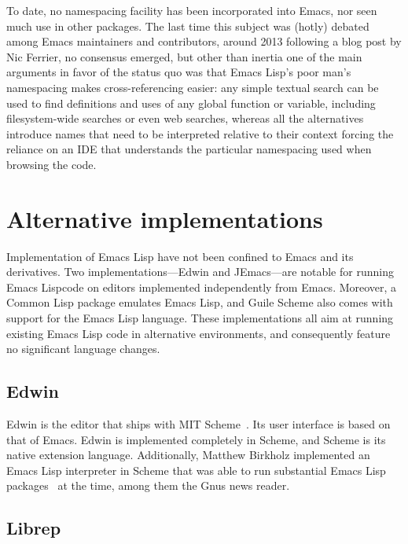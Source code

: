 \documentclass[format=acmsmall, review]{acmart}
\newcommand \Elisp {Emacs Lisp}
\begin{document}
To date, no namespacing facility has been incorporated into Emacs, nor seen
much use in other packages.  The last time this subject was (hotly) debated
among Emacs maintainers and contributors, around 2013 following a blog post
by Nic Ferrier, no consensus emerged, but other than inertia one of the
main arguments in favor of the status quo was that \Elisp's poor man's
namespacing makes cross-referencing easier: any simple textual search can be
used to find definitions and uses of any global function or variable,
including filesystem-wide searches or even web searches,
whereas all the alternatives introduce names that need to be interpreted
relative to their context forcing the reliance on an IDE that understands the
particular namespacing used when browsing the code.



\section{Alternative implementations}
\label{sec:alternative-implementations}

Implementation of \Elisp{} have not been confined to Emacs and its
derivatives.  Two implementations---Edwin and JEmacs---are notable for
running \Elisp code on editors implemented independently from Emacs.
Moreover, a Common Lisp package emulates Emacs Lisp, and Guile Scheme
also comes with support for the \Elisp{} language.
These implementations all aim at running existing \Elisp{}
code in alternative environments, and consequently feature no
significant language changes.

\subsection{Edwin}

Edwin is the editor that ships with MIT Scheme~\cite{MITScheme2014}.
Its user interface is based on that of Emacs.  Edwin is implemented
completely in Scheme, and Scheme is its native extension language.
Additionally, Matthew Birkholz implemented an \Elisp{} interpreter
in Scheme that was able to run substantial \Elisp{}
packages~\cite{Birkholz1993} at the time, among them the Gnus news reader.

\subsection{Librep}
\end{document}
